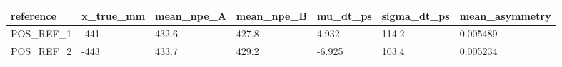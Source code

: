 \begin{tabular}{lllllll}
\hline
reference & x\_true\_mm & mean\_npe\_A & mean\_npe\_B & mu\_dt\_ps & sigma\_dt\_ps & mean\_asymmetry \\
\hline
POS\_REF\_1 & -441 & 432.6 & 427.8 & 4.932 & 114.2 & 0.005489 \\
POS\_REF\_2 & -443 & 433.7 & 429.2 & -6.925 & 103.4 & 0.005234 \\
\hline
\end{tabular}
